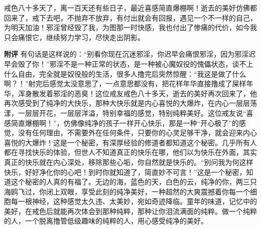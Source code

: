 \begin{case}
    戒色八十多天了，离一百天还有些日子，最近喜感简直爆棚啊！逝去的美好仿佛都回来了，戒下去吧，不抛弃不放弃，有付出就会有回报，遇见一个不一样的自己，为明天加油！邪淫曾经毁了我，为图那一时快感，我也付出了惨痛的代价，如今我只会痛恨它，继续努力学习，尽快走出阴影。

    \textbf{附评} 有句话是这样说的：“别看你现在沉迷邪淫，你迟早会痛恨邪淫，因为邪淫迟早会毁了你！”邪淫不是一种正常的状态，是一种被心魔奴役的傀儡状态，谈不上什么自由，完全就是奴役般的生活，很多人撸完后突然惊醒：“我这是做了什么啊？！”射完后感觉太没意思了，一点意思都没有，把花样年华直接撸成了屎样年华，浑身散发着邪淫的恶臭！这位戒友戒色八十多天，逝去的美好再次回来了，他再次感受到了纯净的大快乐，那种大快乐就是内心喜悦的大爆炸，在内心一层层荡漾，一层层开花，一层层洋溢，特别幸福的感觉，特别纯粹美好。这位戒友说“喜感简直爆棚啊！”，仿佛像纯净的孩子一样开心快乐，那是一种“开心极了”的感觉，没有任何理由，不需要外在任何条件，只要你的心灵足够干净，就会迎来内心喜悦的大爆炸！这是一个秘密，有深厚经验的修道者都知道这个秘密。几乎所有人都在寻找快乐的体验，但世人不知道真正的快乐在哪，他们以为快乐在外面，其实真正的快乐就在内心深处，移除那些心垢，你自然就是快乐的。“别问我为何这样快乐，好好净化你的心吧！到时你就知道了，简直妙不可言！”这是一个秘密，知道这个秘密的人真的有福了。无边的海，蓝色的天，白色的云，纯净的你，两三只海鸥飞过，你闭上双眼，享受此刻的纯净美好，一种超然的大爽震撼着你每一个细胞每一根神经，这种感觉太久违、太美妙，宛如奇迹降临。童年的味道，记忆中的美好，在戒色后就能再次体会到那种纯粹，那种让你泪流满面的纯粹。做一个纯粹的人，一个脱离撸管低级趣味的纯粹的人，用心感受纯净的美好。
\end{case}

